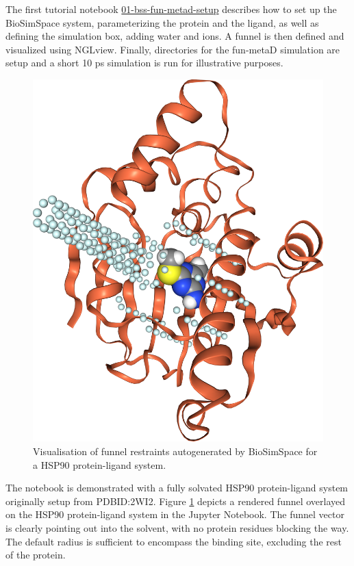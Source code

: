 The first tutorial notebook \href{https://github.com/OpenBioSim/BioSimSpaceTutorials/blob/main/02_funnel_metad/01_bss-fun-metad-setup.ipynb}{01-bss-fun-metad-setup} describes how to set up the BioSimSpace system, parameterizing the protein and the ligand, as well as defining the simulation box, adding water and ions. A funnel is then defined and visualized using NGLview. Finally, directories for the fun-metaD simulation are setup and a short 10 ps simulation is run for illustrative purposes.


\begin{figure}[htp]
\includegraphics[width=\linewidth]{LIVECOMS/02_funnel_metad/funmetad-hsp90.png}
\caption{Visualisation of funnel restraints autogenerated by BioSimSpace for a HSP90 protein-ligand system.}
\label{fig:fun-hsp90}
\end{figure}

The notebook is demonstrated with a fully solvated HSP90 protein-ligand system originally setup from PDBID:2WI2. 
Figure \ref{fig:fun-hsp90} depicts a rendered funnel overlayed on the HSP90 protein-ligand system in the Jupyter Notebook. The funnel vector is clearly pointing out into the solvent, with no protein residues blocking the way. The default radius is sufficient to encompass the binding site, excluding the rest of the protein.


